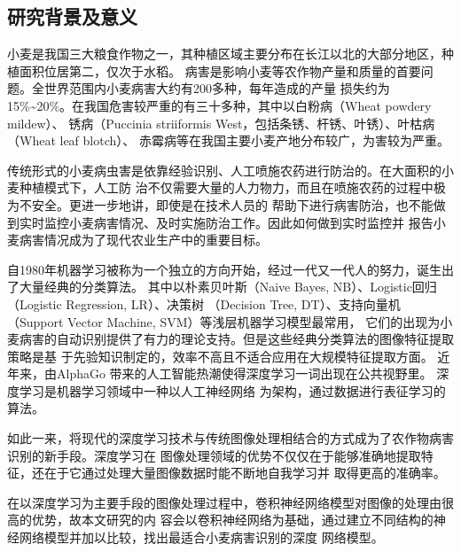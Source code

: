 
\subsection{\textbf{研究背景及意义}}
小麦是我国三大粮食作物之一，其种植区域主要分布在长江以北的大部分地区，种植面积位居第二，仅次于水稻。
病害是影响小麦等农作物产量和质量的首要问题。全世界范围内小麦病害大约有200多种，每年造成的产量
损失约为15\%\textasciitilde20\%。在我国危害较严重的有三十多种，其中以白粉病（Wheat powdery mildew）、
锈病（Puccinia striiformis West，包括条锈、杆锈、叶锈）、叶枯病（Wheat leaf blotch）、
赤霉病等在我国主要小麦产地分布较广，为害较为严重\cite{CGRIS}。

传统形式的小麦病虫害是依靠经验识别、人工喷施农药进行防治的。在大面积的小麦种植模式下，人工防
治不仅需要大量的人力物力，而且在喷施农药的过程中极为不安全。更进一步地讲，即使是在技术人员的
帮助下进行病害防治，也不能做到实时监控小麦病害情况、及时实施防治工作。因此如何做到实时监控并
报告小麦病害情况成为了现代农业生产中的重要目标。

自1980年机器学习被称为一个独立的方向开始，经过一代又一代人的努力，诞生出了大量经典的分类算法。
其中以朴素贝叶斯（Naive Bayes, NB）、Logistic回归（Logistic Regression, LR）、决策树
（Decision Tree, DT）、支持向量机（Support Vector Machine, SVM）等浅层机器学习模型最常用，
它们的出现为小麦病害的自动识别提供了有力的理论支持。但是这些经典分类算法的图像特征提取策略是基
于先验知识制定的，效率不高且不适合应用在大规模特征提取方面\cite{article1}。 近年来，由AlphaGo
带来的人工智能热潮使得深度学习一词出现在公共视野里。 深度学习是机器学习领域中一种以人工神经网络
为架构，通过数据进行表征学习的算法。

如此一来，将现代的深度学习技术与传统图像处理相结合的方式成为了农作物病害识别的新手段。深度学习在
图像处理领域的优势不仅仅在于能够准确地提取特征，还在于它通过处理大量图像数据时能不断地自我学习并
取得更高的准确率。

在以深度学习为主要手段的图像处理过程中，卷积神经网络模型对图像的处理由很高的优势，故本文研究的内
容会以卷积神经网络为基础，通过建立不同结构的神经网络模型并加以比较，找出最适合小麦病害识别的深度
网络模型。
